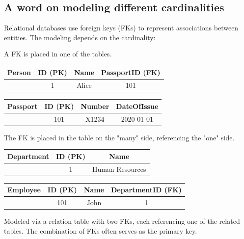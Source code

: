 \documentclass{article}
\begin{document}
\subsection*{A word on modeling different cardinalities}
Relational databases use foreign keys (FKs) to represent associations between entities. The modeling depends on the cardinality:

A FK is placed in one of the tables.

\begin{center}
\begin{tabular}{|c|c|c|c|}
\hline
\textbf{Person} & ID (PK) & Name & PassportID (FK) \\
\hline
 & 1 & Alice & 101 \\
\hline
\end{tabular}
\quad
\begin{tabular}{|c|c|c|c|}
\hline
\textbf{Passport} & ID (PK) & Number & DateOfIssue \\
\hline
 & 101 & X1234 & 2020-01-01 \\
\hline
\end{tabular}
\end{center}

The FK is placed in the table on the "many" side, referencing the "one" side.

\begin{center}
\begin{tabular}{|c|c|c|}
\hline
\textbf{Department} & ID (PK) & Name \\
\hline
 & 1 & Human Resources \\
\hline
\end{tabular}
\quad
\begin{tabular}{|c|c|c|c|}
\hline
\textbf{Employee} & ID (PK) & Name & DepartmentID (FK) \\
\hline
 & 101 & John & 1 \\
\hline
\end{tabular}
\end{center}

\begin{center}
\end{center}

Modeled via a relation table with two FKs, each referencing one of the related tables. The combination of FKs often serves as the primary key.
\end{document}
